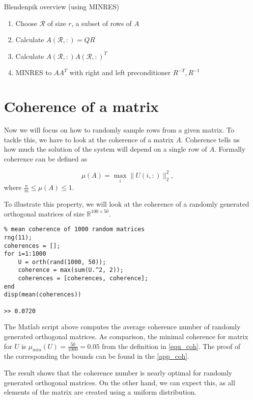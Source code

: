\documentclass{article}
\begin{document}
\begin{algorithm}[htb]
\caption{Blendenpik overview (using MINRES)}
\begin{enumerate}
\item Choose $\mathcal{R}$ of size $r$, a subset of rows of $A$
\item Calculate $A(\mathcal{R},:) = QR$ 
\item Calculate $A(\mathcal{R}, :)A(\mathcal{R}, :)^T$
\item MINRES to $AA^T$ with right and left preconditioner $R^{-T}, R^{-1}$
\end{enumerate}
\end{algorithm}

\section{Coherence of a matrix}
Now we will focus on how to randomly sample rows from a given matrix. To tackle
this, we have to look at the coherence of a matrix $A$. Coherence tells us how
much the solution of the system will depend on a single row of $A$. Formally
coherence can be defined as

\begin{equation} \label{equ_coh}
\mu(A)=\max _{i}\|U(i,:)\|_{2}^{2},
\end{equation}
where $\frac{n}{m} \le \mu(A) \le 1$. 

\bigskip

To illustrate this property, we will look at the coherence of a randomly
generated orthogonal matrices of size $\mathbb{R}^{100 \times 50}$.

\begin{verbatim}
% mean coherence of 1000 random matrices
rng(11);
coherences = [];
for i=1:1000
    U = orth(rand(1000, 50));
    coherence = max(sum(U.^2, 2));
    coherences = [coherences, coherence];
end
disp(mean(coherences))

>> 0.0720
\end{verbatim}

The Matlab script above computes the average coherence number of randomly
generated orthogonal matrices. As comparison, the minimal coherence for matrix
for $U$ is $\mu_{min}(U)= \frac{50}{1000} = 0.05$ from the definition in
\ref{equ_coh}. The proof of the corresponding the bounds can be found in the
\ref{app_coh}.

The result shows that the coherence number is nearly optimal for randomly
generated orthogonal matrices. On the other hand, we can expect this, as all
elements of the matrix are created using a uniform distribution. 
\end{document}
